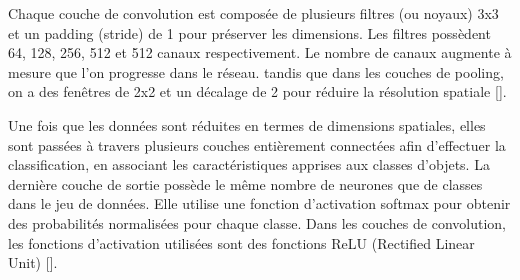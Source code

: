 Chaque couche de convolution est composée de plusieurs filtres (ou noyaux) 3x3 et un padding (stride) de 1 pour préserver les dimensions. Les filtres possèdent 64, 128, 256, 512 et 512 canaux respectivement. Le nombre de canaux augmente à mesure que l'on progresse dans le réseau. tandis que dans les couches de pooling, on a des fenêtres de 2x2 et un décalage de 2 pour réduire la résolution spatiale [\cite{simonyan2014very}]. 

Une fois que les données sont réduites en termes de dimensions spatiales, elles sont passées à travers plusieurs couches entièrement connectées afin d'effectuer la classification, en associant les caractéristiques apprises aux classes d'objets. La dernière couche de sortie possède le même nombre de neurones que de classes dans le jeu de données. Elle utilise une fonction d'activation softmax pour obtenir des probabilités normalisées pour chaque classe. Dans les couches de convolution, les fonctions d'activation utilisées sont des fonctions ReLU (Rectified Linear Unit) [\cite{simonyan2014very}].

